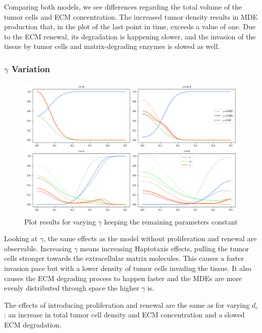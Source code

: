 Comparing both models, we see differences regarding the total volume of the tumor cells and ECM concentration. The increased tumor density results in MDE production that, in the plot of the last point in time, exceeds a value of one. Due to the ECM renewal, its degradation is happening slower, and the invasion of the tissue by tumor cells and matrix-degrading enzymes is slowed as well.

\subsubsection*{$\gamma$ Variation}
\begin{figure}[h!]
    \centering
    \includegraphics[width=\textwidth]{resources/images/prolif_gamma_variation.png}
    \caption{Plot results for varying $\gamma$ keeping the remaining parameters constant}
    \label{fig:prolif_gamma_variation}
\end{figure}

Looking at $\gamma$, the same effects as the model without proliferation and renewal are observable. Increasing $\gamma$ means increasing Haptotaxis effects, pulling the tumor cells stronger towards the extracellular matrix molecules. This causes a faster invasion pace but with a lower density of tumor cells invading the tissue. It also causes the ECM degrading process to happen faster and the MDEs are more evenly distributed through space the higher $\gamma$ is.

The effects of introducing proliferation and renewal are the same as for varying $d_c$: an increase in total tumor cell density and ECM concentration and a slowed ECM degradation. 

